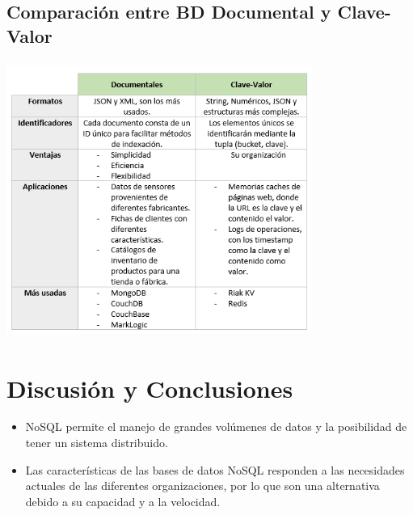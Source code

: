 \documentclass[%
 reprint,
 amsmath,amssymb,
 aps,
]{revtex4-1}
\begin{document}
\subsection{Comparación entre BD Documental y Clave-Valor}
		\begin{center}
		\includegraphics[width=10cm,height=9cm]{./Imagenes/cuadro}
		\end{center}	
\section{Discusión y Conclusiones}\label{sec:5}
	\begin{itemize}
		\item NoSQL permite el manejo de grandes volúmenes de datos y la posibilidad de tener un sistema distribuido.
		\item Las características de las bases de datos NoSQL responden a las necesidades actuales de las diferentes organizaciones, por lo que son una alternativa debido a su capacidad y a la velocidad.
	\end{itemize}





\end{document}
